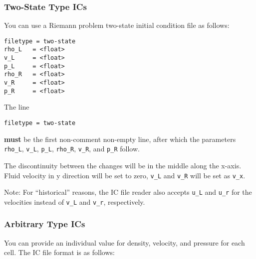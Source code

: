 \subsubsection{Two-State Type ICs}\label{chap:twostate-ic}

You can use a Riemann problem two-state initial condition file as follows:

\begin{lstlisting}
filetype = two-state
rho_L   = <float>
v_L     = <float>
p_L     = <float>
rho_R   = <float>
v_R     = <float>
p_R     = <float>
\end{lstlisting}

The line

\begin{lstlisting}
filetype = two-state
\end{lstlisting}

\textbf{must} be the first non-comment non-empty line, after which the
parameters \texttt{rho\_L}, \texttt{v\_L}, \texttt{p\_L}, \texttt{rho\_R},
\texttt{v\_R}, and \texttt{p\_R} follow.

The discontinuity between the changes will be in the middle along the x-axis.
Fluid velocity in y direction will be set to zero, \texttt{v\_L} and
\texttt{v\_R} will be set as \texttt{v\_x}.

Note: For ``historical'' reasons, the IC file reader also accepts \texttt{u\_L}
and \texttt{u\_r} for the velocities instead of \texttt{v\_L} and
\texttt{v\_r}, respectively.






\subsubsection{Arbitrary Type ICs}\label{chap:arbitrary-ic}




You can provide an individual value for density, velocity, and pressure for each
cell. The IC file format is as follows:

